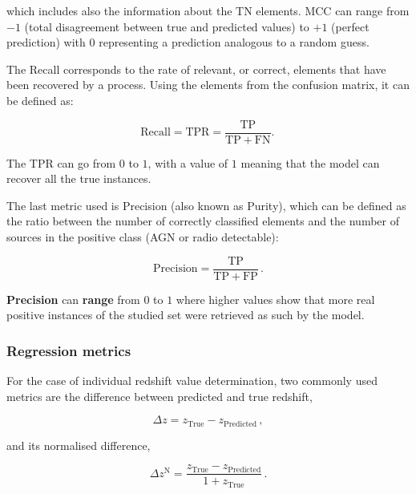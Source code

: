 \documentclass{aa}
\begin{document}
\noindent which includes also the information about the TN elements. MCC can range from $-1$ (total disagreement between true and predicted values) to $+1$ (perfect prediction) with $0$ representing a prediction analogous to a random guess.

The Recall \citep[also called Completeness, Sensitivity, or True Positive Rate -TPR-;][]{10.2307/4586294} corresponds to the rate of relevant, or correct, elements that have been recovered by a process. Using the elements from the confusion matrix, it can be defined as:

\begin{equation}\label{eq:recall}
\mathrm{Recall} = \mathrm{TPR} = \frac{\mathrm{TP}}{\mathrm{TP} + \mathrm{FN}}.\,
\end{equation}

The TPR can go from $0$ to $1$, with a value of $1$ meaning that the model can recover all the true instances. 

The last metric used is Precision (also known as Purity), which can be defined as the ratio between the number of correctly classified elements and the number of sources in the positive class (AGN or radio detectable): 

\begin{equation}\label{eq:precision}
\mathrm{Precision} = \frac{\mathrm{TP}}{\mathrm{TP} + \mathrm{FP}}\,.
\end{equation}

\textbf{Precision} can \textbf{range} from $0$ to $1$ where higher values show that more real positive instances of the studied set were retrieved as such by the model.

\subsubsection{Regression metrics}\label{sec:metrics_regression}

For the case of individual redshift value determination, two commonly used metrics are the difference between predicted and true redshift,

\begin{equation}
\Delta z = z_{\mathrm{True}} - z_{\mathrm{Predicted}}\,,
\end{equation}

\noindent and its normalised difference,

\begin{equation}\label{eq:delta_z_N}
\Delta z^{\mathrm{N}} = \frac{z_{\mathrm{True}} - z_{\mathrm{Predicted}}}{1 + z_{\mathrm{True}}}\,.
\end{equation}
\end{document}
